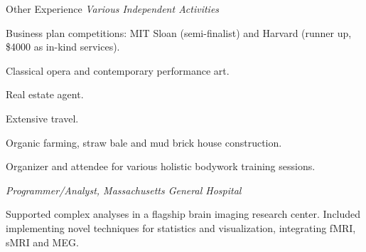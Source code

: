 \begin{rubric}{Other Experience}
\entry*[2003--2004] \emph{Various Independent Activities}
\begin{compactitem} 
    \item Business plan competitions:  MIT Sloan (semi-finalist) and Harvard
        (runner up, \$4000 as in-kind services). 
    \item Classical opera and contemporary performance art.
    \item Real estate agent. 
    \item Extensive travel. 
    \item Organic farming, straw bale and mud brick house construction. 
    \item Organizer and attendee for various holistic bodywork training sessions. 
\end{compactitem}

\entry*[2002] \emph{Programmer/Analyst, Massachusetts General Hospital}
    \par Supported complex analyses in a flagship brain imaging research center.
    Included implementing novel techniques for statistics and visualization,
    integrating fMRI, sMRI and MEG.

\end{rubric}
